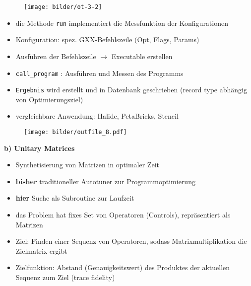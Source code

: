   
  \begin{frame}
    \begin{figure}[ht]
      \centering	      
      \texttt{[image: bilder/ot-3-2]}
      \label{gccpy2}
    \end{figure}
  \end{frame}
  
  
 \begin{frame}
   \begin{itemize}
     \item die Methode \texttt{run} implementiert die Messfunktion der Konfigurationen
     \item Konfiguration: spez. GXX-Befehlszeile (Opt, Flags, Params)
     \item Ausführen der Befehlszeile $\rightarrow$ Executable erstellen
     \item \texttt{call\_program} : Ausführen und Messen des Programms
     \item \texttt{Ergebnis} wird erstellt und in Datenbank geschrieben 
     (record type abhängig von Optimierungsziel) \newline
     \item vergleichbare Anwendung: Halide, PetaBricks, Stencil
   \end{itemize}
 \end{frame}
 
  \begin{frame}
      \begin{figure}[ht]
      \centering	      
      \texttt{[image: bilder/outfile\_8.pdf]}
      \label{gccResults}
    \end{figure}
  \end{frame}    
    
  \begin{frame}
   \textbf{b) Unitary Matrices}
   
    \begin{itemize}
      \item Synthetisierung von Matrizen in optimaler Zeit
      \item \textbf{bisher} traditioneller Autotuner zur Programmoptimierung
      \item \textbf{hier} Suche als Subroutine zur Laufzeit
      \item das Problem hat fixes Set von Operatoren (Controls), repräsentiert als Matrizen
      \item Ziel: Finden einer Sequenz von Operatoren, sodass Matrixmultiplikation die Zielmatrix ergibt
      \item Zielfunktion: Abstand (Genauigkeitswert) des Produktes der aktuellen Sequenz zum Ziel (trace fidelity)
    \end{itemize}
  \end{frame}
  
